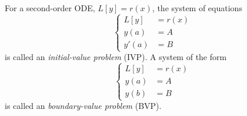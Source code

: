 \begin{definition}
	For a second-order ODE, $L[y] = r(x)$,
	the system of equations
	\begin{equation*}
	\left\{
	\begin{split}
L[y] &= r(x) \\ y(a) &= A \\ y'(a) &= B 
	\end{split}\right.
	\end{equation*}
	is called an \emph{initial-value problem} (IVP). A system of the form
	\begin{equation*}
	\left\{
	\begin{split}
L[y] &= r(x) \\ y(a) &= A \\ y(b) &= B 
	\end{split}\right.
	\end{equation*}
	is called an \emph{boundary-value problem} (BVP).
\end{definition}

